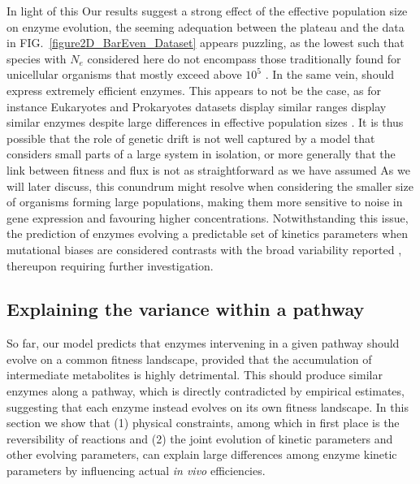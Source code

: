 \documentclass[11pt,onecolumn]{article}
\providecommand{\DIFadd}[1]{{\protect\color{blue} \sf #1}} %
\providecommand{\DIFdel}[1]{{\protect\color{red} \scriptsize #1}} %
\providecommand{\DIFaddbegin}{} %
\providecommand{\DIFaddend}{} %
\providecommand{\DIFdelbegin}{} %
\providecommand{\DIFdelend}{} %
\begin{document}
\DIFdelbegin \DIFdel{In light of this }\DIFdelend \DIFaddbegin \DIFadd{Our results suggest a strong }\DIFaddend effect of the effective population size on enzyme evolution, \DIFdelbegin \DIFdel{the seeming adequation between the plateau and the data in FIG.~\ref{figure2D_BarEven_Dataset} appears puzzling, as the lowest }\DIFdelend \DIFaddbegin \DIFadd{such that species with }\DIFaddend $N_e$ \DIFdelbegin \DIFdel{considered here do not encompass those traditionally found for unicellular organisms that mostly exceed }\DIFdelend \DIFaddbegin \DIFadd{above }\DIFaddend $10^5$ \DIFdelbegin \DIFdel{\citep{Bobay18}. In the same vein, }\DIFdelend \DIFaddbegin \DIFadd{\citep[most unicellular organisms]{Bobay18} should express extremely efficient enzymes. This appears to not be the case, as for instance }\DIFaddend Eukaryotes and Prokaryotes \DIFdelbegin \DIFdel{datasets display similar ranges }\DIFdelend \DIFaddbegin \DIFadd{display similar enzymes }\DIFaddend despite large differences in effective population sizes \citep{Bar-Even11}. \DIFdelbegin \DIFdel{It is thus possible that the role of genetic drift is not well captured by a model that considers small parts of a large system in isolation, or more generally that the link between fitness and flux is not as straightforward as we have assumed}\DIFdelend \DIFaddbegin \DIFadd{As we will later discuss, this conundrum might resolve when considering the smaller size of organisms forming large populations, making them more sensitive to noise in gene expression and favouring higher concentrations}\DIFaddend . 
Notwithstanding this issue, the prediction of enzymes evolving a predictable set of \DIFdelbegin \DIFdel{kinetics parameters when mutational biases are considered contrasts with the broad variability reported \citep{Davidi18}, thereupon requiring further investigation.
}%

\subsection{\DIFdel{Explaining the variance within a pathway}}
\addtocounter{subsection}{-1}%

\DIFdel{So far, our model predicts that enzymes intervening in a given pathway should evolve on a common fitness landscape, provided that the accumulation of intermediate metabolites is highly detrimental. This should produce similar enzymes along a pathway, which is directly contradicted by empirical estimates, suggesting that each enzyme instead evolves on its own fitness landscape. In this section we show that (1) physical constraints, among which in first place is the reversibility of reactions and (2) the joint evolution of kinetic parameters and other evolving parameters, can explain large differences among enzyme kinetic parameters by influencing actual \textit{in vivo} efficiencies. %
}%
\end{document}

